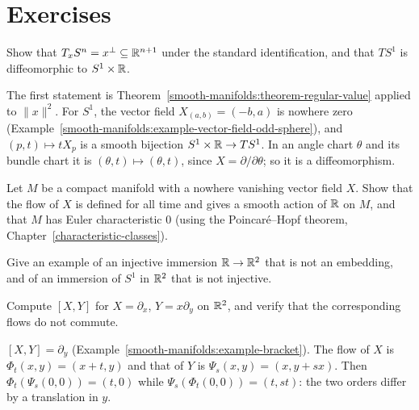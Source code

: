 \section{Exercises}\label{smooth-manifolds:section-exercises}

\begin{exercise}\label{smooth-manifolds:exercise-tangent-sphere}
Show that $T_xS^n = x^\perp \subseteq \mathbb{R}^{n+1}$ under the standard identification, and that $TS^1$ is diffeomorphic to $S^1 \times \mathbb{R}$.
\end{exercise}

\begin{solution}
The first statement is Theorem~\ref{smooth-manifolds:theorem-regular-value} applied to $\|x\|^2$. For $S^1$, the vector field $X_{(a,b)} = (-b, a)$ is nowhere
zero (Example~\ref{smooth-manifolds:example-vector-field-odd-sphere}), and $(p, t) \mapsto tX_p$ is a smooth bijection $S^1 \times \mathbb{R} \to TS^1$. In an angle
chart $\theta$ and its bundle chart it is $(\theta, t) \mapsto (\theta, t)$, since $X = \partial/\partial\theta$; so it is a diffeomorphism.
\end{solution}

\begin{exercise}\label{smooth-manifolds:exercise-no-retraction-smooth}
Let $M$ be a compact manifold with a nowhere vanishing vector field $X$. Show that the flow of $X$ is defined for all time and gives a smooth action of $\mathbb{R}$ on $M$, and that $M$ has Euler characteristic $0$
(using the Poincar\'e--Hopf theorem, Chapter~\ref{characteristic-classes}).
\end{exercise}

\begin{exercise}\label{smooth-manifolds:exercise-immersion-not-embedding}
Give an example of an injective immersion $\mathbb{R} \to \mathbb{R}^2$ that is not an embedding, and of an immersion of $S^1$ in $\mathbb{R}^2$ that is not injective.
\end{exercise}

\begin{exercise}\label{smooth-manifolds:exercise-lie-bracket-computation}
Compute $[X, Y]$ for $X = \partial_x$, $Y = x\partial_y$ on $\mathbb{R}^2$, and verify that the corresponding flows do not commute.
\end{exercise}

\begin{solution}
$[X, Y] = \partial_y$ (Example~\ref{smooth-manifolds:example-bracket}). The flow of $X$ is $\Phi_t(x, y) = (x + t, y)$ and that of $Y$ is
$\Psi_s(x, y) = (x, y + sx)$. Then $\Phi_t(\Psi_s(0, 0)) = (t, 0)$ while $\Psi_s(\Phi_t(0, 0)) = (t, st)$: the two orders differ by a translation in $y$.
\end{solution}

